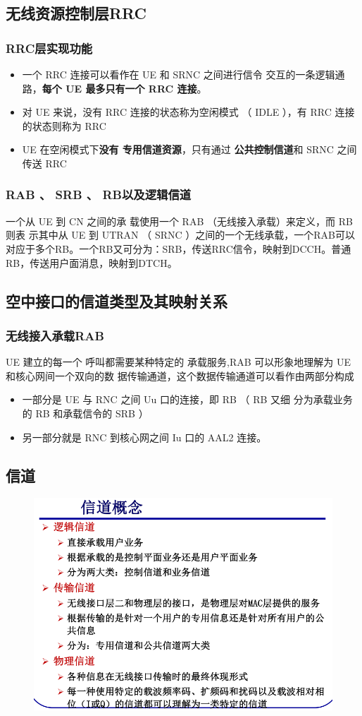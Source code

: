 \subsection{无线资源控制层RRC}
\subsubsection{RRC层实现功能}
\begin{itemize}
	\item 一个 RRC 连接可以看作在 UE 和 SRNC 之间进行信令
	交互的一条逻辑通路，\textbf{每个 UE 最多只有一个 RRC 连接}。
	\item 对 UE 来说，没有 RRC 连接的状态称为空闲模式
	（ IDLE ），有 RRC 连接的状态则称为 RRC
	\item UE 在空闲模式下\textbf{没有
	专用信道资源}，只有通过
\textbf{公共控制信道}和 SRNC 之间
	传送 RRC	
\end{itemize}
\subsubsection{RAB 、 SRB 、 RB以及逻辑信道}
一个从 UE 到 CN 之间的承
载使用一个 RAB （无线接入承载）来定义，而 RB 则表
示其中从 UE 到 UTRAN （ SRNC ）之间的一个无线承载，一个RAB可以对应于多个RB。一个RB又可分为：SRB，传送RRC信令，映射到DCCH。普通RB，传送用户面消息，映射到DTCH。
\subsection{空中接口的信道类型及其映射关系}
\subsubsection{无线接入承载RAB}
 UE 建立的每一个
呼叫都需要某种特定的
承载服务,RAB 可以形象地理解为 UE 和核心网间一个双向的数
据传输通道，这个数据传输通道可以看作由两部分构成
\begin{itemize}
	\item 一部分是 UE 与 RNC 之间 Uu 口的连接，即 RB （ RB 又细
	分为承载业务的 RB 和承载信令的 SRB ）
	\item 另一部分就是 RNC 到核心网之间 Iu 口的 AAL2 连接。
\end{itemize}
\subsection{信道}
\begin{figure}[H]
	\centering
	\includegraphics[width=0.7\linewidth]{figures/screenshot0020}
	\caption{}
	\label{fig:screenshot0020}
\end{figure}

